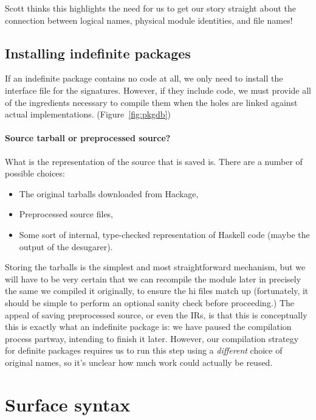\documentclass{article}
\begin{document}
Scott thinks this highlights the need for us to get our story straight about
the connection between logical names, physical module identities, and file
names!


\subsection{Installing indefinite packages}\label{sec:installing-indefinite}

If an indefinite package contains no code at all, we only need
to install the interface file for the signatures.  However, if
they include code, we must provide all of the
ingredients necessary to compile them when the holes are linked against
actual implementations.  (Figure~\ref{fig:pkgdb})

\paragraph{Source tarball or preprocessed source?}  What is the representation of the source that is saved is.  There
are a number of possible choices:

\begin{itemize}
    \item The original tarballs downloaded from Hackage,
    \item Preprocessed source files,
    \item Some sort of internal, type-checked representation of Haskell code (maybe the output of the desugarer).
\end{itemize}

Storing the tarballs is the simplest and most straightforward mechanism,
but we will have to be very certain that we can recompile the module
later in precisely the same we compiled it originally, to ensure the hi
files match up (fortunately, it should be simple to perform an optional
sanity check before proceeding.) The appeal of saving preprocessed
source, or even the IRs, is that this is conceptually this is exactly
what an indefinite package is: we have paused the compilation process
partway, intending to finish it later.  However, our compilation strategy
for definite packages requires us to run this step using a \emph{different}
choice of original names, so it's unclear how much work could actually be reused.

\section{Surface syntax}
\end{document}
